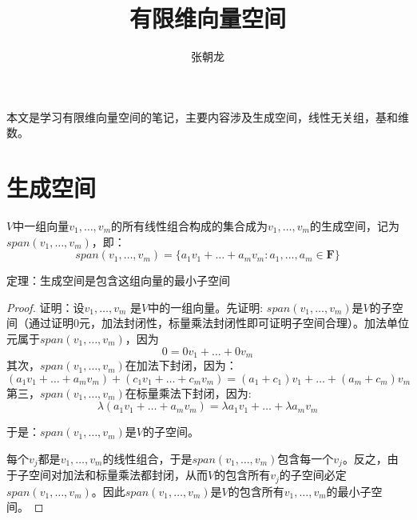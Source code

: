 \documentclass[10pt,a4paper,UTF8]{article}
\author{张朝龙}
\date{}
\title{有限维向量空间}
\begin{document}
\maketitle
\tableofcontents
{}
\newpage

本文是学习有限维向量空间的笔记，主要内容涉及生成空间，线性无关组，基和维数。



\section{生成空间}
\label{sec:orgheadline1}


\begin{definition}
\(V\)中一组向量\(v_{1},\ldots ,v_{m}\)的所有线性组合构成的集合成为\(v_{1},\ldots ,v_{m}\)的生成空间，记为\(span (v_{1},\ldots ,v_{m})\)，即：\[span(v_{1},\ldots ,v_{m})= \{a_{1}v_{1} + \ldots + a_{m}v_{m}: a_{1},\ldots ,a_{m} \in \mathbf{F}\}\]
\end{definition}

\begin{theorem}
定理：生成空间是包含这组向量的最小子空间
\end{theorem}

\begin{proof}
证明：设\(v_{1},\ldots ,v_{m}\) 是\(V\)中的一组向量。先证明: \(span(v_{1},\ldots ,v_{m})\)是\(V\)的子空间（通过证明\(0\)元，加法封闭性，标量乘法封闭性即可证明子空间合理）。加法单位元属于\(span(v_{1},\ldots ,v_{m})\)，因为\[0 = 0v_{1} + \ldots + 0v_{m}\]其次，\(span(v_{1},\ldots ,v_{m})\)在加法下封闭，因为：\[(a_{1}v_{1} + \ldots + a_{m}v_{m}) + (c_{1}v_{1} + \ldots + c_{m}v_{m}) = (a_{1} + c_{1})v_{1} + \ldots + (a_{m}+c_{m})v_{m}\]第三，\(span(v_{1},\ldots ,v_{m})\)在标量乘法下封闭，因为:\[\lambda (a_{1}v_{1} + \ldots + a_{m}v_{m}) = \lambda a_{1}v_{1} + \ldots + \lambda a_{m}v_{m}\]

于是：\(span(v_{1},\ldots ,v_{m})\)是\(V\)的子空间。

每个\(v_{j}\)都是\(v_{1},\ldots ,v_{m}\)的线性组合，于是\(span(v_{1},\ldots ,v_{m})\)包含每一个\(v_{j}\)。反之，由于子空间对加法和标量乘法都封闭，从而\(V\)的包含所有\(v_{j}\)的子空间必定\(span(v_{1},\ldots ,v_{m})\)。因此\(span(v_{1},\ldots ,v_{m})\)是\(V\)的包含所有\(v_{1},\ldots ,v_{m}\)的最小子空间。
\end{proof}
\end{document}
